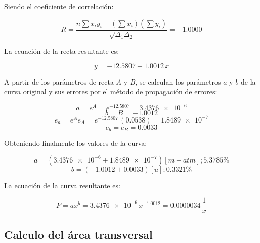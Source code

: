 \documentclass[letter,11pt]{article}
\begin{document}
Siendo el coeficiente de correlación:

\begin{equation*}
    R = \frac{n \sum x_i y_i - (\sum x_i)(\sum y_i)}{\sqrt{\Delta_1 \Delta_2}}
      = -1.0000
\end{equation*}
\vspace{0.10cm}

La ecuación de la recta resultante es:

\begin{equation*}
    y = -12.5807 - 1.0012\,x
\end{equation*}
\vspace{0.10cm}

A partir de los parámetros de recta $A$ y $B$, se calculan los parámetros $a$ y
$b$ de la curva original y sus errores por el método de propagación de errores:

\begin{equation*}
    a = e^{A} = e^{-12.5807} = \num{3.4376e-6}
\end{equation*}
\begin{equation*}
    b = B = -1.0012
\end{equation*}
\begin{equation*}
    e_a = e^A e_A = e^{-12.5807}\,(0.0538) = \num{1.8489e-7}
\end{equation*}
\begin{equation*}
    e_b = e_B = 0.0033
\end{equation*}
\vspace{0.10cm}

Obteniendo finalmente los valores de la curva:

\begin{equation*}
    a = (\num{3.4376e-6} \pm \num{1.8489e-7}) [m-atm]; 5.3785\%
\end{equation*}
\begin{equation*}
    b = (-1.0012 \pm 0.0033) [u]; 0.3321\%
\end{equation*}
\vspace{0.10cm}

La ecuación de la curva resultante es:

\begin{equation*}
    P = a x^b = \num{3.4376e-6}\,x^{-1.0012} = 0.0000034\,\frac{1}{x}
\end{equation*}
\vspace{0.10cm}

\subsection{Calculo del área transversal}
\end{document}
